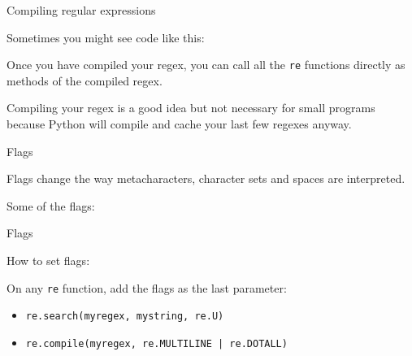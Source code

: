 \documentclass{beamer}
\begin{document}
\begin{frame}{Compiling regular expressions}

Sometimes you might see code like this:



{\small Once you have compiled your regex, you can call all the \lstinline$re$ functions
directly as methods of the compiled regex. }

\bigskip

{\small Compiling your regex is a good idea but not necessary for small
programs because Python will compile and cache your last few regexes anyway.}

\end{frame}

\begin{frame}{Flags}

Flags change the way metacharacters, character sets and spaces are interpreted.

\bigskip

Some of the flags:

\end{frame}

\begin{frame}{Flags}

How to set flags:

\bigskip

On any \lstinline$re$ function, add the flags as the last parameter:

\begin{itemize}
  \item \lstinline$re.search(myregex, mystring, re.U)$
  \item \lstinline$re.compile(myregex, re.MULTILINE | re.DOTALL)$
\end{itemize}

\end{frame}
\end{document}
